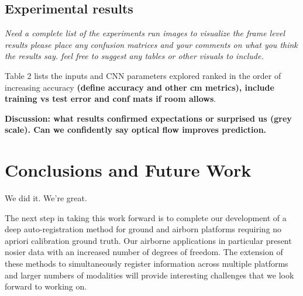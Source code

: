 \documentclass{article}
\begin{document}
\subsection{Experimental results} %
\label{sub:experimental_results}
\textit{Need a complete list of the experiments run
images to visualize the frame level results
please place any confusion matrices and your comments on what you think the results say.
feel free to suggest any tables or other visuals to include.}

Table 2 lists the inputs and CNN parameters explored ranked in the order of increasing accuracy \textbf{(define accuracy and other cm metrics), include training vs test error and conf mats if room allows}.  

 \textbf{Discussion: what results confirmed expectations or surprised us (grey scale). Can we confidently say optical flow improves prediction. }



\section{Conclusions and Future Work} %
\label{sec:conclusions_and_future_work}
We did it. We're great.

The next step in taking this work forward is to complete our development of a deep auto-registration method for ground and airborn platforms requiring no apriori calibration ground truth.  Our airborne applications in particular present nosier data with an increased number of degrees of freedom. The extension of these methods to simultaneously register information across multiple platforms and larger numbers of modalities will provide interesting challenges that we look forward to working on. 






\end{document}
